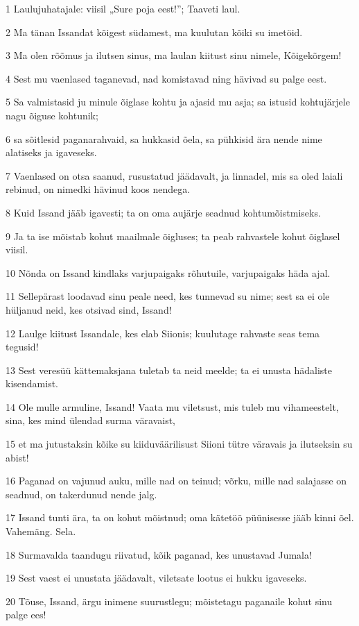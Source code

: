 \par 1 Laulujuhatajale: viisil „Sure poja eest!”; Taaveti laul.
\par 2 Ma tänan Issandat kõigest südamest, ma kuulutan kõiki su imetöid.
\par 3 Ma olen rõõmus ja ilutsen sinus, ma laulan kiitust sinu nimele, Kõigekõrgem!
\par 4 Sest mu vaenlased taganevad, nad komistavad ning hävivad su palge eest.
\par 5 Sa valmistasid ju minule õiglase kohtu ja ajasid mu asja; sa istusid kohtujärjele nagu õiguse kohtunik;
\par 6 sa sõitlesid paganarahvaid, sa hukkasid õela, sa pühkisid ära nende nime alatiseks ja igaveseks.
\par 7 Vaenlased on otsa saanud, rusustatud jäädavalt, ja linnadel, mis sa oled laiali rebinud, on nimedki hävinud koos nendega.
\par 8 Kuid Issand jääb igavesti; ta on oma aujärje seadnud kohtumõistmiseks.
\par 9 Ja ta ise mõistab kohut maailmale õigluses; ta peab rahvastele kohut õiglasel viisil.
\par 10 Nõnda on Issand kindlaks varjupaigaks rõhutuile, varjupaigaks häda ajal.
\par 11 Sellepärast loodavad sinu peale need, kes tunnevad su nime; sest sa ei ole hüljanud neid, kes otsivad sind, Issand!
\par 12 Laulge kiitust Issandale, kes elab Siionis; kuulutage rahvaste seas tema tegusid!
\par 13 Sest veresüü kättemaksjana tuletab ta neid meelde; ta ei unusta hädaliste kisendamist.
\par 14 Ole mulle armuline, Issand! Vaata mu viletsust, mis tuleb mu vihameestelt, sina, kes mind ülendad surma väravaist,
\par 15 et ma jutustaksin kõike su kiiduväärilisust Siioni tütre väravais ja ilutseksin su abist!
\par 16 Paganad on vajunud auku, mille nad on teinud; võrku, mille nad salajasse on seadnud, on takerdunud nende jalg.
\par 17 Issand tunti ära, ta on kohut mõistnud; oma kätetöö püünisesse jääb kinni õel. Vahemäng. Sela.
\par 18 Surmavalda taandugu riivatud, kõik paganad, kes unustavad Jumala!
\par 19 Sest vaest ei unustata jäädavalt, viletsate lootus ei hukku igaveseks.
\par 20 Tõuse, Issand, ärgu inimene suurustlegu; mõistetagu paganaile kohut sinu palge ees!

